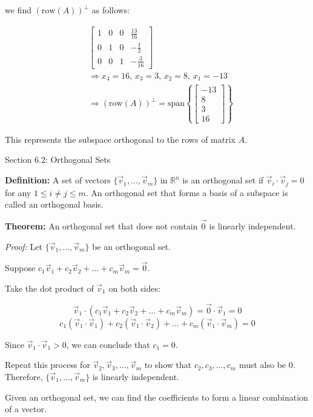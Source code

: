 \documentclass{article}
\begin{document}
we find \( (\text{row}(A))^{\perp} \) as follows:

\begin{align*}
&\begin{bmatrix} 1 & 0 & 0 & \frac{13}{16} \\ 0 & 1 & 0 & -\frac{1}{2} \\ 0 & 0 & 1 & -\frac{3}{16} \end{bmatrix} \\
&\Rightarrow x_4 = 16, \, x_3 = 3, \, x_2 = 8, \, x_1 = -13 \\
&\Rightarrow (\text{row}(A))^{\perp} = \text{span}\left\{ \begin{bmatrix} -13 \\ 8 \\ 3 \\ 16 \end{bmatrix} \right\}
\end{align*}

This represents the subspace orthogonal to the rows of matrix \( A \).


Section 6.2:  Orthogonal Sets

\textbf{Definition:} A set of vectors \( \{\vec{v}_1, \ldots, \vec{v}_m\} \) in \( \mathbb{R}^n \) is an orthogonal set if \( \vec{v}_i \cdot \vec{v}_j = 0 \) for any \( 1 \leq i \neq j \leq m \). An orthogonal set that forms a basis of a subspace is called an orthogonal basis.

\textbf{Theorem:} An orthogonal set that does not contain \( \vec{0} \) is linearly independent.

\textit{Proof:} Let \( \{\vec{v}_1, \ldots, \vec{v}_m\} \) be an orthogonal set.

Suppose \( c_1\vec{v}_1 + c_2\vec{v}_2 + \ldots + c_m\vec{v}_m = \vec{0} \). 

Take the dot product of \( \vec{v}_1 \) on both sides:

\[ \vec{v}_1 \cdot (c_1\vec{v}_1 + c_2\vec{v}_2 + \ldots + c_m\vec{v}_m) = \vec{0} \cdot \vec{v}_1 = 0 \]
\[ c_1(\vec{v}_1 \cdot \vec{v}_1) + c_2(\vec{v}_1 \cdot \vec{v}_2) + \ldots + c_m(\vec{v}_1 \cdot \vec{v}_m) = 0 \]

Since \( \vec{v}_1 \cdot \vec{v}_1 > 0 \), we can conclude that \( c_1 = 0 \).

Repeat this process for \( \vec{v}_2, \vec{v}_3, \ldots, \vec{v}_m \) to show that \( c_2, c_3, \ldots, c_m \) must also be \( 0 \). Therefore, \( \{\vec{v}_1, \ldots, \vec{v}_m\} \) is linearly independent.

Given an orthogonal set, we can find the coefficients to form a linear combination of a vector.
\end{document}
